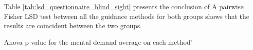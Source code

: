 Table \ref{tab:lsd_questionnaire_blind_sight} presents the conclusion of 
A pairwise Fisher LSD test between all the guidance methods for both groups shows that the results are coincident between the two groups.


\begin{table}[!thb]
    \caption{Anova p-value for the mental demand average on each method'}
    \label{tab:lsd_questionnaire_blind_sight}
    \begin{minipage}{1\textwidth}
        
    \end{minipage}
    \begin{minipage}{1\textwidth}
        
    \end{minipage}
\end{table}
